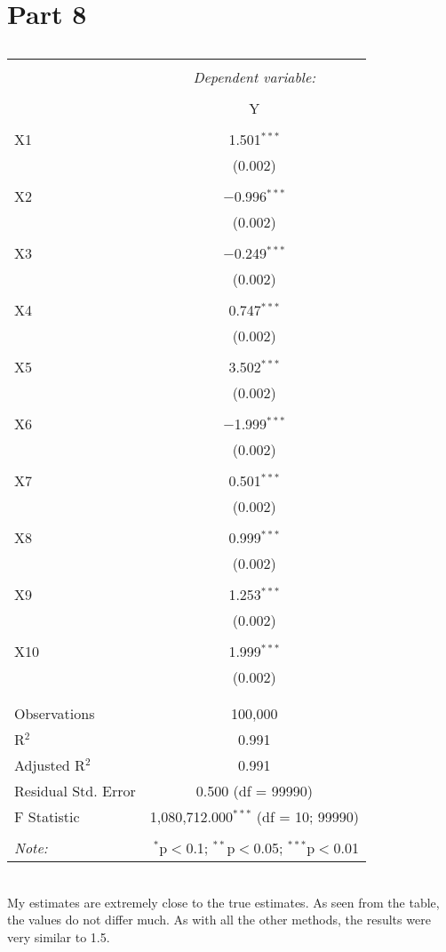 \documentclass{article}
\begin{document}
\section{Part 8}
\begin{table}[!htbp] \centering 
  \caption{} 
  \label{} 
\begin{tabular}{@{\extracolsep{5pt}}lc} 
\\[-1.8ex]\hline 
\hline \\[-1.8ex] 
 & \multicolumn{1}{c}{\textit{Dependent variable:}} \\ 
\cline{2-2} 
\\[-1.8ex] & Y \\ 
\hline \\[-1.8ex] 
 X1 & 1.501$^{***}$ \\ 
  & (0.002) \\ 
  & \\ 
 X2 & $-$0.996$^{***}$ \\ 
  & (0.002) \\ 
  & \\ 
 X3 & $-$0.249$^{***}$ \\ 
  & (0.002) \\ 
  & \\ 
 X4 & 0.747$^{***}$ \\ 
  & (0.002) \\ 
  & \\ 
 X5 & 3.502$^{***}$ \\ 
  & (0.002) \\ 
  & \\ 
 X6 & $-$1.999$^{***}$ \\ 
  & (0.002) \\ 
  & \\ 
 X7 & 0.501$^{***}$ \\ 
  & (0.002) \\ 
  & \\ 
 X8 & 0.999$^{***}$ \\ 
  & (0.002) \\ 
  & \\ 
 X9 & 1.253$^{***}$ \\ 
  & (0.002) \\ 
  & \\ 
 X10 & 1.999$^{***}$ \\ 
  & (0.002) \\ 
  & \\ 
\hline \\[-1.8ex] 
Observations & 100,000 \\ 
R$^{2}$ & 0.991 \\ 
Adjusted R$^{2}$ & 0.991 \\ 
Residual Std. Error & 0.500 (df = 99990) \\ 
F Statistic & 1,080,712.000$^{***}$ (df = 10; 99990) \\ 
\hline 
\hline \\[-1.8ex] 
\textit{Note:}  & \multicolumn{1}{r}{$^{*}$p$<$0.1; $^{**}$p$<$0.05; $^{***}$p$<$0.01} \\ 
\end{tabular} 
\end{table}\\

My estimates are extremely close to the true estimates. As seen from the table, the values do not differ much. As with all the other methods, the results were very similar to 1.5.
\end{document}
